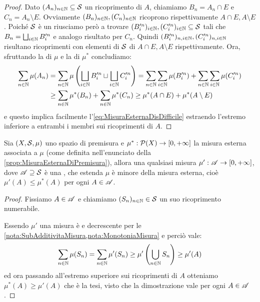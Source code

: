 \begin{proof}
	Dato $(A_n)_{n\in\N}\subseteq\S$ un ricoprimento di $A$, chiamiamo $B_n=A_n\cap E$ e $C_n=A_n\setminus E$. Ovviamente $(B_n)_{n\in\N},(C_n)_{n\in\N}$ ricoprono rispettivamente $A\cap E,A\setminus E$. Poiché $\S$ è un \semiring{} riusciamo però a trovare $(B'^n_i)_{i\in\N},(C'^n_i)_{i\in\N} \subseteq \S$ tali che $B_n=\bigsqcup_{i\in\N}B'^n_i$ e analogo risultato per $C_n$. Quindi $(B'^n_i)_{n,i\in\N}, (C'^n_i)_{n,i\in\N}$ risultano ricoprimenti con elementi di $\S$ di $A\cap E,A\setminus E$ rispettivamente.
	Ora, sfruttando la \sigadd[ità] di $\mu$ e la \sigsubadd[ità] di $\mu^*$ concludiamo:
	\begin{align*}
		\sum_{n\in\N}\mu(A_n)&=
		\sum_{n\in\N} \mu\left(\bigsqcup_{i\in\N} B'^n_i\sqcup \bigsqcup_{i\in\N} C'^n_i\right)=
		\sum_{n\in\N}\sum_{i\in\N}\mu(B'^n_i)+\sum_{n\in\N}\sum_{i\in\N}\mu(C'^n_i)\\
		&\ge
		\sum_{n\in\N}\mu^*(B_n)+\sum_{n\in\N}\mu^*(C_n)
		\ge \mu^*(A\cap E)+\mu^*(A\setminus E)
	\end{align*}
	e questo implica facilmente l'\cref{eq:MisuraEsternaDisDifficile} estraendo l'estremo inferiore a entrambi i membri sui ricoprimenti di $A$.
\end{proof}
\begin{remark}\label{nota:PremisuraMassimaMisura}
	Sia $(X,\S,\mu)$ uno spazio di premisura e $\mu^*:\mathcal P(X)\to\Rpiu$ la misura esterna associata a $\mu$ (come definita nell'enunciato della \cref{prop:MisuraEsternaDiPremisura}), allora una qualsiasi misura $\mu':\A\to\Rpiu$, dove $\A\supseteq \S$ è una \sigalg{}, che estenda $\mu$ è minore della misura esterna, cioè $\mu'(A)\le \mu^*(A)$ per ogni $A\in\A$.
\end{remark}
\begin{proof}
	Fissiamo $A\in\A$ e chiamiamo $(S_n)_{n\in\N}\in\S$ un suo ricoprimento numerabile.
	
	Essendo $\mu'$ una misura è \sigsubadd{} e decrescente per le \cref{nota:SubAdditivitaMisura,nota:MonotoniaMisura} e perciò vale:
	\begin{equation*}
		\sum_{n\in\N}\mu(S_n)=\sum_{n\in\N}\mu'(S_n)\ge \mu'\left(\bigcup_{n\in\N}S_n\right)\ge \mu'(A)
	\end{equation*}
	ed ora passando all'estremo superiore sui ricoprimenti di $A$ otteniamo $\mu^*(A)\ge\mu'(A)$ che è la tesi, visto che la dimostrazione vale per ogni $A\in\A$.
\end{proof}



